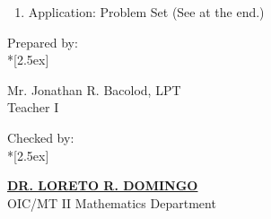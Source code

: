 \documentclass[12pt]{article}
\def \Teacher {
Mr. Jonathan R. Bacolod, LPT 
}
\def \Checker {
\underline{\textbf{DR. LORETO R. DOMINGO}}\\
OIC/MT II Mathematics Department
}
\def \PE {
 
}
\def \PS {

}
\begin{document}
\begin{enumerate}[label = \textbf{\Roman*. }]
\begin{enumerate}[label = \Alph*. ]
\begin{enumerate}[label = \arabic*. ]
		\end{enumerate}


	\item Application: Problem Set (See at the end.) \\

	\end{enumerate}

\end{enumerate}



\PE 


\PS

\vfill

\begin{flushright}
Prepared by:\\*[2.5ex]
\Teacher \\
Teacher I
\end{flushright} 

\vspace*{3.5ex}

\begin{flushright}
Checked by:\\*[2.5ex]
\Checker
\end{flushright} 
\end{document}
